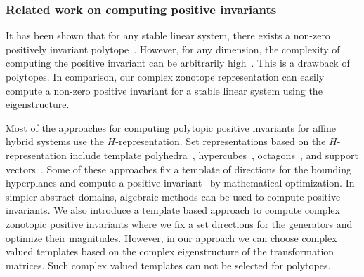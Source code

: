 \subsubsection{Related work on computing positive invariants}
It has been shown that for any stable linear system, there exists a
non-zero positively invariant polytope~\cite{todo}.  However, for any
dimension, the complexity of computing the positive invariant can be
arbitrarily high~\cite{todo}.  This is a drawback of polytopes.  In
comparison, our complex zonotope representation can easily compute a
non-zero positive invariant for a stable linear system using the
eigenstructure.

Most of the approaches for computing polytopic positive invariants for
affine hybrid systems use the $H$-representation.  Set representations
based on the $H$-representation include template
polyhedra~\cite{todo}, hypercubes~\cite{todo}, octagons~\cite{todo},
and support vectors~\cite{todo}.  Some of these approaches fix a
template of directions for the bounding hyperplanes and compute a
positive invariant~\cite{todo} by mathematical optimization.  In
simpler abstract domains, algebraic methods can be used to compute
positive invariants.  We also introduce a template based approach to
compute complex zonotopic positive invariants where we fix a set
directions for the generators and optimize their magnitudes.  However,
in our approach we can choose complex valued templates based on the
complex eigenstructure of the transformation matrices.  Such complex
valued templates can not be selected for polytopes.






